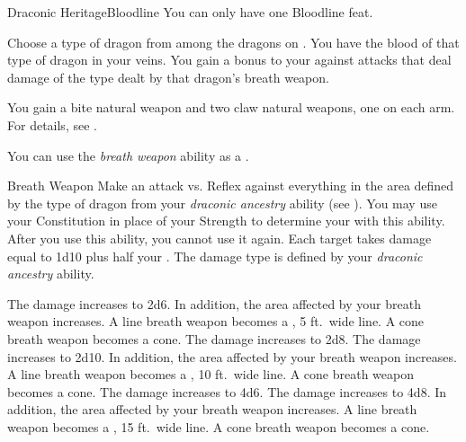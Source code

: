     \begin{feat}{Draconic Heritage}{Bloodline}
         You can only have one Bloodline feat.

         Choose a type of dragon from among the dragons on .
        You have the blood of that type of dragon in your veins.
        You gain a  bonus to your  against attacks that deal damage of the type dealt by that dragon's breath weapon.

         You gain a bite natural weapon and two claw natural weapons, one on each arm.
        For details, see .

         You can use the \textit{breath weapon} ability as a .
        \begin{freeability}{Breath Weapon}
            Make an attack vs. Reflex against everything in the area defined by the type of dragon from your \textit{draconic ancestry} ability (see ).
            You may use your Constitution in place of your Strength to determine your  with this ability.
            After you use this ability, you  cannot use it again.
            \hit Each target takes damage equal to 1d10 plus half your .
            The damage type is defined by your \textit{draconic ancestry} ability.

            \rankline
             The damage increases to 2d6.
                In addition, the area affected by your breath weapon increases.
                A line breath weapon becomes a \arealarge, 5 ft.\ wide line.
                A cone breath weapon becomes a \areamed cone.
             The damage increases to 2d8.
             The damage increases to 2d10.
                In addition, the area affected by your breath weapon increases.
                A line breath weapon becomes a \areahuge, 10 ft.\ wide line.
                A cone breath weapon becomes a \arealarge cone.
             The damage increases to 4d6.
             The damage increases to 4d8.
                In addition, the area affected by your breath weapon increases.
                A line breath weapon becomes a \areagarg, 15 ft.\ wide line.
                A cone breath weapon becomes a \areahuge cone.
        \end{freeability}


\end{feat}
